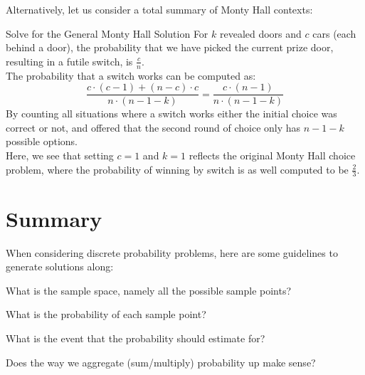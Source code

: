 Alternatively, let us consider a total summary of Monty Hall contexts:
\begin{ln-practice}{Solve for the General Monty Hall Solution}{}
    For $k$ revealed doors and $c$ cars (each behind a door), the probability that we have picked the current prize door, resulting in a futile switch, is $\frac{c}{n}$. \\
    The probability that a switch works can be computed as:
    \[
        \frac{c \cdot (c - 1) + (n - c) \cdot c}{n \cdot (n - 1 - k)} = \frac{c \cdot (n - 1)}{n \cdot (n - 1 - k)}
    \]
    By counting all situations where a switch works either the initial choice was correct or not, and offered that the second round of choice only has $n - 1 - k$ possible options. \\

    Here, we see that setting $c = 1$ and $k = 1$ reflects the original Monty Hall choice problem, where the probability of winning by switch is as well computed to be $\frac{2}{3}$.
\end{ln-practice}

\section{Summary}
When considering discrete probability problems, here are some guidelines to generate solutions along:
\begin{bindenum}
    \item What is the sample space, namely all the possible sample points?
    \item What is the probability of each sample point?
    \item What is the event that the probability should estimate for?
    \item Does the way we aggregate (sum/multiply) probability up make sense?
\end{bindenum}

